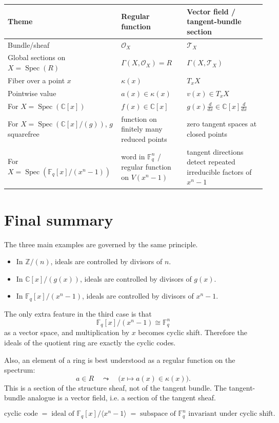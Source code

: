 \documentclass[11pt]{article}
\theoremstyle{definition}
\newcommand{\Z}{\mathbb{Z}}
\newcommand{\C}{\mathbb{C}}
\newcommand{\F}{\mathbb{F}}
\newcommand{\Spec}{\operatorname{Spec}}
\newcommand{\kk}[1]{\kappa\!\left(#1\right)}
\newcommand{\ideal}[1]{\langle #1\rangle}
\begin{document}
	\begin{longtable}{@{}p{}p{}p{}@{}}
		\toprule
		\textbf{Theme} & \textbf{Regular function} & \textbf{Vector field / tangent-bundle section} \\ \midrule
		Bundle/sheaf & \(\mathcal O_X\) & \(\mathcal T_X\) \\
		Global sections on \(X=\Spec(R)\) & \(\Gamma(X,\mathcal O_X)=R\) & \(\Gamma(X,\mathcal T_X)\) \\
		Fiber over a point \(x\) & \(\kk{x}\) & \(T_xX\) \\
		Pointwise value & \(a(x)\in \kk{x}\) & \(v(x)\in T_xX\) \\
		For \(X=\Spec(\C[x])\) & \(f(x)\in \C[x]\) & \(g(x)\frac{d}{dx}\in \C[x]\frac{d}{dx}\) \\
		For \(X=\Spec(\C[x]/(g))\), \(g\) squarefree & function on finitely many reduced points & zero tangent spaces at closed points \\
		For \(X=\Spec(\F_q[x]/(x^n-1))\) & word in \(\F_q^n\) / regular function on \(V(x^n-1)\) & tangent directions detect repeated irreducible factors of \(x^n-1\) \\
		\bottomrule
	\end{longtable}
	
	\section{Final summary}
	
	The three main examples are governed by the same principle.
	
	\begin{itemize}
		\item In \(\Z/(n)\), ideals are controlled by divisors of \(n\).
		
		\item In \(\C[x]/(g(x))\), ideals are controlled by divisors of \(g(x)\).
		
		\item In \(\F_q[x]/(x^n-1)\), ideals are controlled by divisors of \(x^n-1\).
	\end{itemize}
	
	The only extra feature in the third case is that
	\[
	\F_q[x]/(x^n-1)\cong \F_q^n
	\]
	as a vector space, and multiplication by \(x\) becomes cyclic shift. Therefore the ideals of the quotient ring are exactly the cyclic codes.
	
	Also, an element of a ring is best understood as a regular function on the spectrum:
	\[
	a\in R
	\quad\leadsto\quad
	\bigl(x\mapsto a(x)\in \kk{x}\bigr).
	\]
	This is a section of the structure sheaf, not of the tangent bundle. The tangent-bundle analogue is a vector field, i.e. a section of the tangent sheaf.
	
	\begin{center}
		\[
		\boxed{
			\text{cyclic code}
			\;=\;
			\text{ideal of }\F_q[x]/\ideal{x^n-1}
			\;=\;
			\text{subspace of }\F_q^n\text{ invariant under cyclic shift}.
		}
		\]
	\end{center}
	
\end{document}
